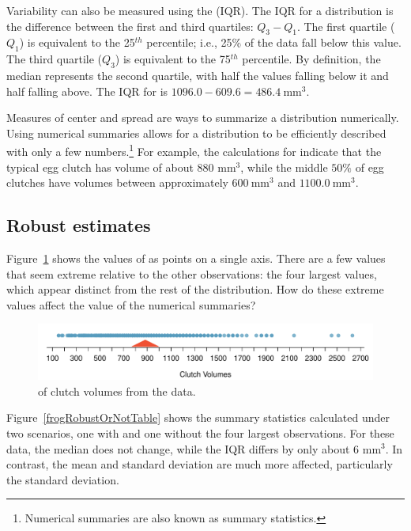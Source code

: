 
Variability can also be measured using the  (IQR). The IQR for a distribution is the difference between the first and third quartiles: $Q_3 - Q_1$. The first quartile ($Q_1$) is equivalent to the 25$^{th}$ percentile; i.e., 25\% of the data fall below this value. The third quartile ($Q_3$) is equivalent to the 75$^{th}$ percentile. By definition, the median represents the second quartile, with half the values falling below it and half falling above. The IQR for  is $1096.0 - 609.6 = 486.4\ \textrm{mm}^{3}$.  

Measures of center and spread are ways to summarize a distribution numerically. Using numerical summaries allows for a distribution to be efficiently described with only a few numbers.\footnote{Numerical summaries are also known as summary statistics.} For example, the calculations for  indicate that the typical egg clutch has volume of about 880 mm$^3$, while the middle $50\%$ of egg clutches have volumes between approximately $600\ \textrm{mm}^{3}$ and $1100.0\ \textrm{mm}^{3}$.
\textD{\\[5mm]}


\subsection{Robust estimates}

Figure~\ref{frogClutchVolDotPlot} shows the values of  as points on a single axis. There are a few values that seem extreme relative to the other observations: the four largest values, which appear distinct from the rest of the distribution. How do these extreme values affect the value of the numerical summaries?

\begin{figure}[ht]
	\centering
	\includegraphics[width=\textwidth]{ch_01a_intro_to_data_oi_biostat/figures/frogClutchVolDotPlot/frogClutchVolDotPlot}
    \caption{ of clutch volumes from the  data.}
	\label{frogClutchVolDotPlot}
\end{figure}

Figure~\ref{frogRobustOrNotTable} shows the summary statistics calculated under two scenarios, one with and one without the four largest observations. For these data, the median does not change, while the IQR differs by only about 6 $\textrm{mm}^{3}$. In contrast, the mean and standard deviation are much more affected, particularly the standard deviation.

